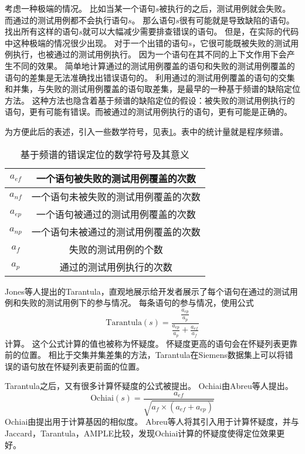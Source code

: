 考虑一种极端的情况。
比如当某一个语句$s$被执行的之后，测试用例就会失败。
而通过的测试用例都不会执行语句$s$。
那么语句$s$很有可能就是导致缺陷的语句。
找出所有这样的语句$s$就可以大幅减少需要排查错误的语句。
但是，在实际的代码中这种极端的情况很少出现。
对于一个出错的语句$s$，它很可能既被失败的测试用例执行，也被通过的测试用例执行。
因为一个语句在其不同的上下文作用下会产生不同的效果。
简单地计算通过的测试用例覆盖的语句和失败的测试用例覆盖的语句的差集是无法准确找出错误语句的。
利用通过的测试用例覆盖的语句的交集和并集，与失败的测试用例覆盖的语句取差集，是最早的一种基于频谱的缺陷定位方法\parencite{Renieres2003Fault}。
这种方法也隐含着基于频谱的缺陷定位的假设：被失败的测试用例执行的语句，更有可能有错误。而被通过的测试用例执行的语句，更有可能是正确的。

为方便此后的表述，引入一些数学符号，见表\ref{spec_symbol}。表中的统计量就是程序频谱。
\begin{table}
\centering
\begin{tabular}{|c|c|}
\hline
$a_{ef}$ & 一个语句被失败的测试用例覆盖的次数 \\
\hline
$a_{nf}$ & 一个语句未被失败的测试用例覆盖的次数 \\
\hline
$a_{ep}$ & 一个语句被通过的测试用例覆盖的次数 \\
\hline
$a_{np}$ & 一个语句未被通过的测试用例覆盖的次数 \\
\hline
$a_{f}$ & 失败的测试用例的个数 \\
\hline
$a_{p}$ & 通过的测试用例执行的次数 \\
\hline
\end{tabular}
\caption{基于频谱的错误定位的数学符号及其意义}
\label{spec_symbol}
\end{table}

Jones等人提出的Tarantula\parencite{Jones2002Visualization}，直观地展示给开发者展示了每个语句在通过的测试用例和失败的测试用例下的参与情况。
每条语句的参与情况，使用公式
$$
\mathrm{Tarantula}(s) = \frac{\frac{a_{ep}}{a_{p}}}{\frac{a_{ep}}{a_{p}} + \frac{a_{ef}}{a_{f}}}
$$
计算。
这个公式计算的值也被称为怀疑度。
怀疑度更高的语句会在怀疑列表更靠前的位置。
相比于交集并集差集的方法，Tarantula在Siemens数据集上可以将错误的语句放在怀疑列表更前面的位置\parencite{Jones2005Empirical}。

Tarantula之后，又有很多计算怀疑度的公式被提出。
Ochiai由Abreu等人提出\parencite{Abreu2006An}。
$$
\mathrm{Ochiai}(s) = \frac{a_{ef}}{\sqrt{a_{f} \times (a_{ef} + a_{ep})}}
$$
Ochiai由\parencite{Meyer2004Comparison}提出用于计算基因的相似度。
Abreu等人将其引入用于计算怀疑度，并与Jaccard\parencite{Chen2002Pinpoint}，Tarantula，AMPLE\parencite{Dallmeier2005Lightweight}比较，发现Ochiai计算的怀疑度使得定位效果更好\parencite{Abreu2006An,Abreu2007On}。

